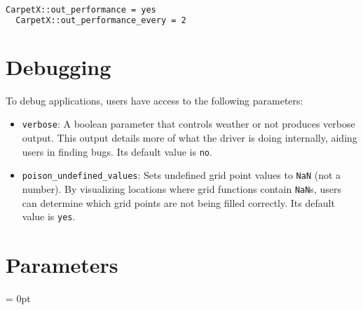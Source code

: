 \begin{lstlisting}[language=bash]
  CarpetX::out_performance = yes  
  CarpetX::out_performance_every = 2
\end{lstlisting}

\section{Debugging}
\label{sec:debugging}

To debug \CarpetX\space applications, users have access to the following parameters: 
%
\begin{itemize}
    \item \texttt{verbose}: A boolean parameter that controls weather or not \CarpetX\space produces verbose output. This output details more of what the driver is doing internally, aiding users in finding bugs. Its default value is \texttt{no}.

    \item \texttt{poison\_undefined\_values}: Sets undefined grid point values to \texttt{NaN} (not a number). By visualizing locations where grid functions contain \texttt{NaN}s, users can determine which grid points are not being filled correctly. Its default value is \texttt{yes}.
\end{itemize}






\section{Parameters} 


\parskip = 0pt

\setlength{\tableWidth}{160mm}

\setlength{\paraWidth}{\tableWidth}
\setlength{\descWidth}{\tableWidth}
\settowidth{\maxVarWidth}{out\_norm\_omit\_sumloc\_for\_backward\_compatibility}

\addtolength{\paraWidth}{-\maxVarWidth}
\addtolength{\paraWidth}{-\columnsep}
\addtolength{\paraWidth}{-\columnsep}
\addtolength{\paraWidth}{-\columnsep}

